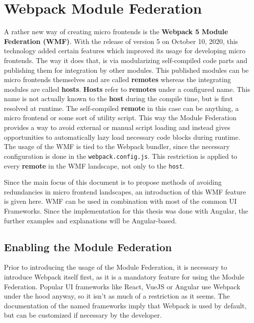 \chapter{Webpack Module Federation} %
\label{Chapter5}


A rather new way of creating micro frontends is the \textbf{Webpack 5 Module Federation (WMF)}. With the release of version 5 on October 10, 2020, this technology added certain features which improved its usage for developing micro frontends.\cite{wmf_concepts}
The way it does that, is via modularizing self-compiled code parts and publishing them for integration by other modules. This published modules can be micro frontends themselves and are called \textbf{remotes} whereas the integrating modules are called \textbf{hosts}. 
\textbf{Hosts} refer to \textbf{remotes} under a configured name. This name is not actually known to the \textbf{host} during the compile time, but is first resolved at runtime.
The self-compiled \textbf{remote} in this case can be anything, a micro frontend or some sort of utility script. This way the Module Federation provides a way to avoid external or manual script loading and instead gives opportunities to automatically lazy load necessary code blocks during runtime.\cite{wmf_concepts}
The usage of the WMF is tied to the Webpack bundler, since the necessary configuration is done in the \texttt{webpack.config.js}. This restriction is applied to every \textbf{remote} in the WMF landscape, not only to the \texttt{host}.

Since the main focus of this document is to propose methods of avoiding redundancies in micro frontend landscapes, an introduction of this WMF feature is given here.
WMF can be used in combination with most of the common UI Frameworks. Since the implementation for this thesis was done with Angular, the further examples and explanations will be Angular-based.

\section{Enabling the Module Federation}

Prior to introducing the usage of the Module Federation, it is necessary to introduce Webpack itself first, as it is a mandatory feature for using the Module Federation. Popular UI frameworks like React, VueJS or Angular use Webpack under the hood anyway, so it isn't as much of a restriction as it seems.\cite{webpack_angular}\cite{webpack_react}\cite{webpack_vue}
The documentation of the named frameworks imply that Webpack is used by default, but can be customized if necessary by the developer.

